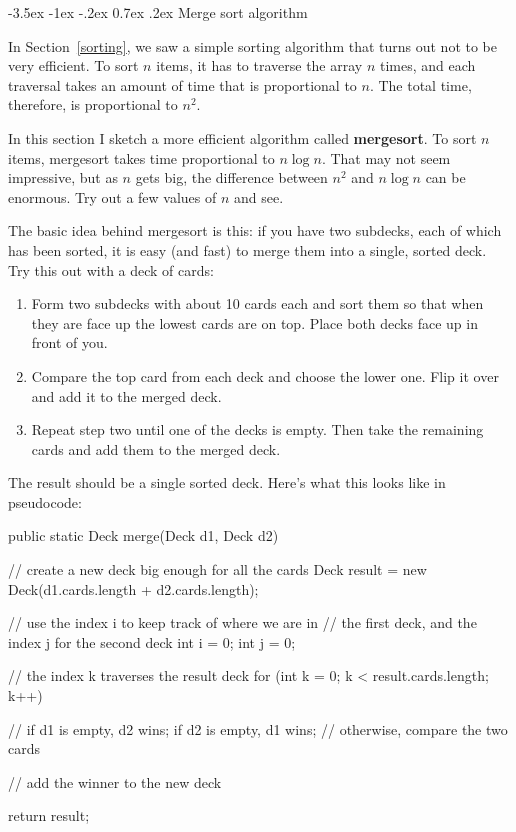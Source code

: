 \documentclass[12pt]{book}
\makeatletter
\renewcommand{\section}{\@startsection {section}{1}{\z@}%
    {-3.5ex \@plus -1ex \@minus -.2ex}%
    {0.7ex \@plus.2ex}%
    {\normalfont\Large\bfseries}}
\theoremstyle{exercise}
\makeatother
\begin{document}
\section{Merge sort algorithm}
\label{mergesort}

In Section~\ref{sorting}, we saw a simple sorting algorithm that turns out not to be very efficient.
To sort $n$ items, it has to traverse the array $n$ times, and each traversal takes an amount of time that is proportional to $n$.
The total time, therefore, is proportional to $n^2$.

In this section I sketch a more efficient algorithm called {\bf mergesort}.
To sort $n$ items, mergesort takes time proportional to $n \log n$.
That may not seem impressive, but as $n$ gets big, the difference between $n^2$ and $n \log n$ can be enormous.
Try out a few values of $n$ and see.

The basic idea behind mergesort is this: if you have two subdecks, each of which has been sorted, it is easy (and fast) to merge them into a single, sorted deck.
Try this out with a deck of cards:

\begin{enumerate}

\item Form two subdecks with about 10 cards each and sort them so that when they are face up the lowest cards are on top.
Place both decks face up in front of you.

\item Compare the top card from each deck and choose the lower one.
Flip it over and add it to the merged deck.

\item Repeat step two until one of the decks is empty.
Then take the remaining cards and add them to the merged deck.

\end{enumerate}

The result should be a single sorted deck.
Here's what this looks like in pseudocode:

\begin{code}
public static Deck merge(Deck d1, Deck d2) {
    // create a new deck big enough for all the cards
    Deck result = new Deck(d1.cards.length + d2.cards.length);

    // use the index i to keep track of where we are in
    // the first deck, and the index j for the second deck
    int i = 0;
    int j = 0;

    // the index k traverses the result deck
    for (int k = 0; k < result.cards.length; k++) {

        // if d1 is empty, d2 wins; if d2 is empty, d1 wins;
        // otherwise, compare the two cards

        // add the winner to the new deck
    }
    return result;
}
\end{code}
\end{document}
